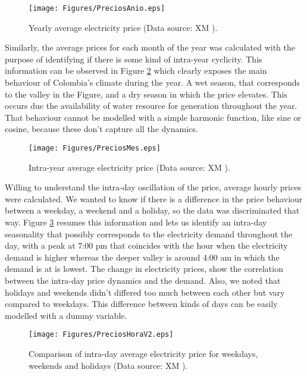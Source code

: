 \documentclass[3p]{elsarticle}
\begin{document}
\begin{figure}[!h]
\center
\texttt{[image: Figures/PreciosAnio.eps]}
\caption{Yearly average electricity price (Data source: XM \cite{XM}).}
\label{fig:yearly}
\end{figure}

Similarly, the average prices for each month of the year was calculated with the purpose of identifying if there is some kind of intra-year cyclicity. This information can be observed in Figure \ref{fig:intraYear} which clearly exposes the main behaviour of Colombia's climate during the year. A wet season, that corresponds to the valley in the Figure, and a dry season in which the price elevates. This occurs due the availability of water resource for generation throughout the year. That behaviour cannot be modelled with a simple harmonic function, like sine or cosine, because these don't capture all the dynamics.

\begin{figure}[!h]
\center
\texttt{[image: Figures/PreciosMes.eps]}
\caption{Intra-year average electricity price (Data source: XM \cite{XM}).}
\label{fig:intraYear}
\end{figure}

Willing to understand the intra-day oscillation of the price, average hourly prices were calculated. We wanted to know if there is a difference in the price behaviour between a weekday, a weekend and a holiday, so the data was discriminated that way. Figure \ref{fig:intraDay} resumes this information and lets us identify an intra-day seasonality that possibly corresponds to the electricity demand throughout the day, with a peak at 7:00 pm that coincides with the hour when the electricity demand is higher whereas the deeper valley is around 4:00 am in which the demand is at is lowest. The change in electricity prices, show the correlation between the intra-day price dynamics and the demand. Also, we noted that holidays and weekends didn't differed too much between each other but vary compared to weekdays. This difference between kinds of days can be easily modelled with a dummy variable. 

\begin{figure}[!h]
\center
\texttt{[image: Figures/PreciosHoraV2.eps]}
\caption{Comparison of intra-day average electricity price for weekdays, weekends and holidays (Data source: XM \cite{XM}).}
\label{fig:intraDay}
\end{figure}
\end{document}
